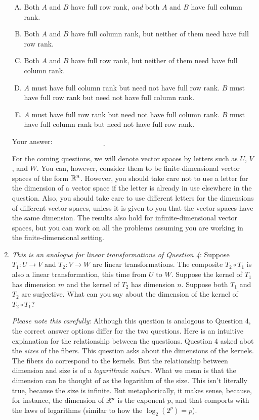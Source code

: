 \documentclass[10pt]{amsart}
\begin{document}
\begin{enumerate}
  \begin{enumerate}[(A)]
  \item Both $A$ and $B$ have full row rank, {\em and} both $A$ and
    $B$ have full column rank.
  \item Both $A$ and $B$ have full column rank, but neither of them
    need have full row rank.
  \item Both $A$ and $B$ have full row rank, but neither of them need
    have full column rank.
  \item $A$ must have full column rank but need not have full row
    rank. $B$ must have full row rank but need not have full column
    rank.
  \item $A$ must have full row rank but need not have full column
    rank. $B$ must have full column rank but need not have full row
    rank.
  \end{enumerate}

  \vspace{0.1in}
  Your answer: $\underline{\qquad\qquad\qquad\qquad\qquad\qquad\qquad}$
  \vspace{0.5in}

  For the coming questions, we will denote vector spaces by letters
  such as $U$, $V$, and $W$. You can, however, consider them to be
  finite-dimensional vector spaces of the form $\mathbb{R}^n$. However, you
  should take care not to use a letter for the dimension of a vector
  space if the letter is already in use elsewhere in the
  question. Also, you should take care to use different letters for
  the dimensions of different vector spaces, unless it is given to you
  that the vector spaces have the same dimension. The results also
  hold for infinite-dimensional vector spaces, but you can work on all
  the problems assuming you are working in the finite-dimensional
  setting.

\item {\em This is an analogue for linear transformations of Question
  4}: Suppose $T_1: U \to V$ and $T_2:V \to W$ are linear
  transformations. The composite $T_2 \circ T_1$ is also a linear
  transformation, this time from $U$ to $W$. Suppose the kernel of
  $T_1$ has dimension $m$ and the kernel of $T_2$ has dimension
  $n$. Suppose both $T_1$ and $T_2$ are surjective. What can you say
  about the dimension of the kernel of $T_2 \circ T_1$?

  {\em Please note this carefully}: Although this question is
  analogous to Question 4, the correct answer options differ for the
  two questions. Here is an intuitive explanation for the relationship
  between the questions. Question 4 asked abot the {\em sizes} of the
  fibers. This question asks about the dimensions of the kernels. The
  fibers do correspond to the kernels. But the relationship between
  dimension and size is of a {\em logarithmic nature}. What we mean is
  that the dimension can be thought of as the logarithm of the
  size. This isn't literally true, because the size is infinite. But
  metaphorically, it makes sense, because, for instance, the dimension
  of $\mathbb{R}^p$ is the exponent $p$, and that comports with the laws of
  logarithms (similar to how the $\log_2(2^p) = p$).
  

\end{enumerate}
\end{document}
